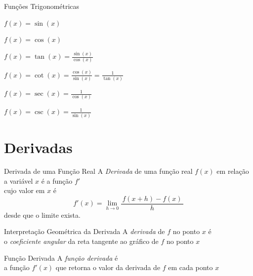 \begin{frame}{Funções Trigonométricas}
  \begin{description}[<+->]
    \item[Seno]       \tabto{30mm} \(f(x) = \sin(x)\)       \\[5mm]
    \item[Cosseno]    \tabto{30mm} \(f(x) = \cos(x)\)       \\[5mm]
    \item[Tangente]   \tabto{30mm} \(f(x) = \tan(x) = \frac{\sin(x)}{\cos(x)}\) \\[5mm]
    \item[Cotangente] \tabto{30mm} \(f(x) = \cot(x) = \frac{\cos(x)}{\sin(x)} = \frac{1}{\tan(x)}\) \\[5mm]
    \item[Secante]    \tabto{30mm} \(f(x) = \sec(x) = \frac{1}{\cos(x)} \)      \\[5mm]
    \item[Cossecante] \tabto{30mm} \(f(x) = \csc(x) = \frac{1}{\sin(x)} \)
  \end{description}
\end{frame}

\section{Derivadas}

\begin{frame}{Derivada de uma Função Real}
  A \emph{Derivada} de uma função real $f(x)$ em relação
  a variável $x$
  \pause
  é a função $f'$\\
  cujo valor em $x$ é
  \[
    f'(x) = \lim_{h\to 0} \frac{\,f(x+h)-f(x)\,}{h}
  \]
  desde que o limite exista.
\end{frame}

\begin{frame}{Interpretação Geométrica da Derivada}
  A \emph{derivada} de $f$ no ponto $x$ é \\[3mm]
  \pause
  o \emph{coeficiente angular}
  da reta tangente ao gráfico de $f$ no ponto $x$
\end{frame}

\begin{frame}{Função Derivada}
  A \emph{função derivada} é \\[3mm]
  \pause
  a função \(f'(x)\) que retorna o valor da derivada de $f$ em cada ponto $x$
\end{frame}

